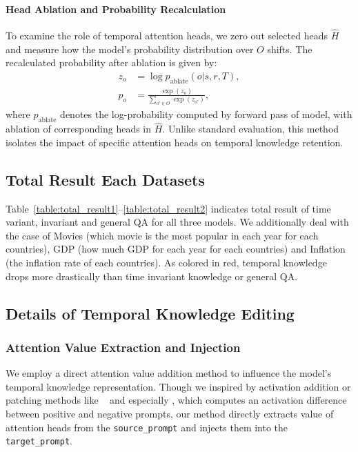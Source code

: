 \paragraph{Head Ablation and Probability Recalculation}
To examine the role of temporal attention heads, we zero out selected heads \( \hat{H} \) and measure how the model's probability distribution over \( O \) shifts.  
The recalculated probability after ablation is given by:
\begin{align}
    z_o &= \log p_\text{ablate}(o|s,r,T),
    \\ \hat{p}_o &= \frac{\exp(z_o)}{\sum_{o' \in O} \exp(z_{o'})},
\end{align}
where \( p_{\text{ablate}} \) denotes the log-probability computed by forward pass of model, with ablation of corresponding heads in \( \hat{H} \).
Unlike standard evaluation, this method isolates the impact of specific attention heads on temporal knowledge retention.


\subsection{Total Result Each Datasets}
\label{app:total_qa}
Table~\ref{table:total_result1}--\ref{table:total_result2} indicates total result of time variant, invariant and general QA for all three models.
We additionally deal with the case of Movies (which movie is the most popular in each year for each countries), GDP (how much GDP for each year for each countries) and Inflation (the inflation rate of each countries).
As colored in red, temporal knowledge drops more drastically than time invariant knowledge or general QA.


\subsection{Details of Temporal Knowledge Editing}
\label{appendix:temp-edit}

\subsubsection{Attention Value Extraction and Injection}
We employ a direct attention value addition method to influence the model’s temporal knowledge representation.
Though we inspired by activation addition or patching methods like ~\citealp{actaddllama2, iti, cast, saevector} and especially \citealp{actadd}, which computes an activation difference between positive and negative prompts, our method directly extracts value of attention heads from the \texttt{source\_prompt} and injects them into the \texttt{target\_prompt}.

